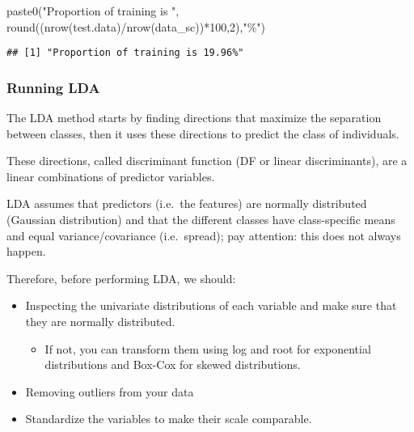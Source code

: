 \documentclass[
]{article}
\newenvironment{Shaded}{\begin{snugshade}}{\end{snugshade}}
\newcommand{\DecValTok}[1]{\textcolor[rgb]{0.00,0.00,0.81}{#1}}
\newcommand{\FunctionTok}[1]{\textcolor[rgb]{0.00,0.00,0.00}{#1}}
\newcommand{\NormalTok}[1]{#1}
\newcommand{\SpecialCharTok}[1]{\textcolor[rgb]{0.00,0.00,0.00}{#1}}
\newcommand{\StringTok}[1]{\textcolor[rgb]{0.31,0.60,0.02}{#1}}
\providecommand{\tightlist}{%
  \setlength{\itemsep}{0pt}\setlength{\parskip}{0pt}}
\begin{document}
\begin{Shaded}
\begin{Highlighting}[]
\FunctionTok{paste0}\NormalTok{(}\StringTok{"Proportion of training is "}\NormalTok{, }\FunctionTok{round}\NormalTok{((}\FunctionTok{nrow}\NormalTok{(test.data)}\SpecialCharTok{/}\FunctionTok{nrow}\NormalTok{(data\_sc))}\SpecialCharTok{*}\DecValTok{100}\NormalTok{,}\DecValTok{2}\NormalTok{),}\StringTok{"\%"}\NormalTok{)}
\end{Highlighting}
\end{Shaded}

\begin{verbatim}
## [1] "Proportion of training is 19.96%"
\end{verbatim}

\hypertarget{running-lda}{%
\subsubsection{Running LDA}\label{running-lda}}

The LDA method starts by finding directions that maximize the separation
between classes, then it uses these directions to predict the class of
individuals.

These directions, called discriminant function (DF or linear
discriminants), are a linear combinations of predictor variables.

LDA assumes that predictors (i.e.~the features) are normally distributed
(Gaussian distribution) and that the different classes have
class-specific means and equal variance/covariance (i.e.~spread); pay
attention: this does not always happen.

Therefore, before performing LDA, we should:

\begin{itemize}
\tightlist
\item
  Inspecting the univariate distributions of each variable and make sure
  that they are normally distributed.

  \begin{itemize}
  \tightlist
  \item
    If not, you can transform them using log and root for exponential
    distributions and Box-Cox for skewed distributions.
  \end{itemize}
\item
  Removing outliers from your data
\item
  Standardize the variables to make their scale comparable.
\end{itemize}
\end{document}
